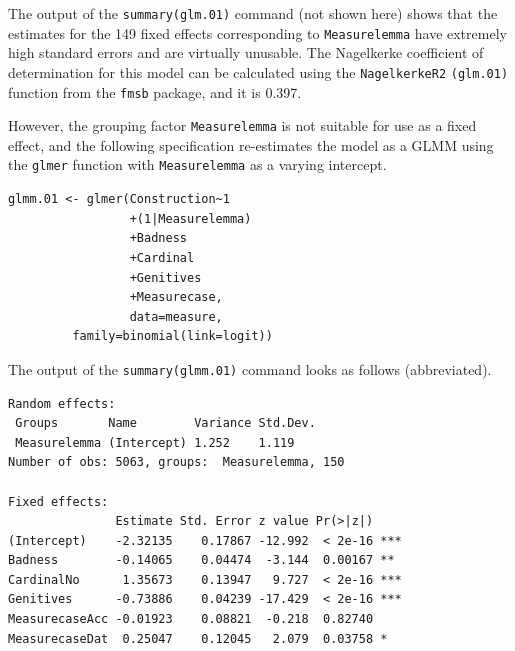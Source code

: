 The output of the \texttt{summary(glm.01)} command (not shown here) shows that the estimates for the 149 fixed effects corresponding to \texttt{Measurelemma} have extremely high standard errors and are virtually unusable.
The Nagelkerke coefficient of determination for this model can be calculated using the \texttt{NagelkerkeR2} \texttt{(glm.01)} function from the \texttt{fmsb} package, and it is 0.397.

However, the grouping factor \texttt{Measurelemma} is not suitable for use as a fixed effect, and the following specification re-estimates the model as a GLMM using the \texttt{glmer} function with \texttt{Measurelemma} as a varying intercept.

\vspace{0.5\baselineskip}

\begin{lstlisting}
glmm.01 <- glmer(Construction~1
                 +(1|Measurelemma)
                 +Badness
                 +Cardinal
                 +Genitives
                 +Measurecase,
                 data=measure,
		 family=binomial(link=logit))
\end{lstlisting}

The output of the \texttt{summary(glmm.01)} command looks as follows (abbreviated).

\vspace{0.5\baselineskip}

\begin{lstlisting}
Random effects:
 Groups       Name        Variance Std.Dev.
 Measurelemma (Intercept) 1.252    1.119   
Number of obs: 5063, groups:  Measurelemma, 150

Fixed effects:
               Estimate Std. Error z value Pr(>|z|)    
(Intercept)    -2.32135    0.17867 -12.992  < 2e-16 ***
Badness        -0.14065    0.04474  -3.144  0.00167 ** 
CardinalNo      1.35673    0.13947   9.727  < 2e-16 ***
Genitives      -0.73886    0.04239 -17.429  < 2e-16 ***
MeasurecaseAcc -0.01923    0.08821  -0.218  0.82740    
MeasurecaseDat  0.25047    0.12045   2.079  0.03758 *  
\end{lstlisting}

